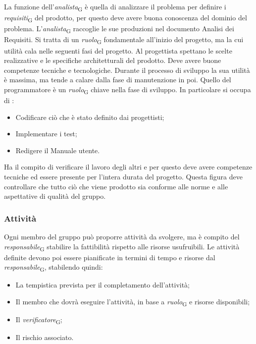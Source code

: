 La funzione dell'\textit{analista}\textsubscript{G} è quella di analizzare il problema per definire i \textit{requisiti}\textsubscript{G} del prodotto, per questo deve avere buona conoscenza del dominio del problema. L'\textit{analista}\textsubscript{G} raccoglie le sue produzioni nel documento Analisi dei Requisiti. Si tratta di un \textit{ruolo}\textsubscript{G} fondamentale all'inizio del progetto, ma la cui utilità cala nelle seguenti fasi del progetto.
Al progettista spettano le scelte realizzative e le specifiche architetturali del prodotto. Deve avere buone competenze tecniche e tecnologiche. Durante il processo di sviluppo la sua utilità è massima, ma tende a calare dalla fase di manutenzione in poi.
Quello del programmatore è un \textit{ruolo}\textsubscript{G} chiave nella fase di sviluppo. In particolare si occupa di :
\begin{itemize}
    \item Codificare ciò che è stato definito dai progettisti;
    \item Implementare i test;
    \item Redigere il Manuale utente.
\end{itemize}
Ha il compito di verificare il lavoro degli altri e per questo deve avere competenze tecniche ed essere presente per l'intera durata del progetto. Questa figura deve controllare che tutto ciò che viene prodotto sia conforme alle norme e alle aspettative di qualità del gruppo.


\subsubsection{Attività}
Ogni membro del gruppo può proporre attività da svolgere, ma è compito del \textit{responsabile}\textsubscript{G} stabilire la fattibilità rispetto alle risorse usufruibili. 
Le attività definite devono poi essere pianificate in termini di tempo e risorse dal \textit{responsabile}\textsubscript{G}, stabilendo quindi:
\begin{itemize}
    \item La tempistica prevista per il completamento dell'attività;
    \item Il membro che dovrà eseguire l'attività, in base a \textit{ruolo}\textsubscript{G} e risorse disponibili;
    \item Il \textit{verificatore}\textsubscript{G};
    \item Il rischio associato.
\end{itemize}


